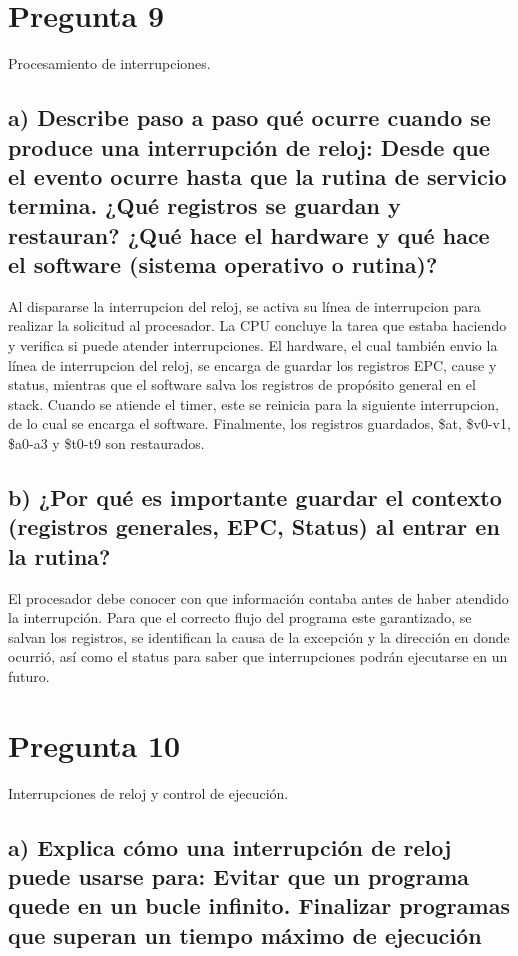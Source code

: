 \documentclass[12pt]{article}
\begin{document}
\section*{Pregunta 9}
Procesamiento de interrupciones.

\subsection*{a) Describe paso a paso qué ocurre cuando se produce una interrupción de reloj: Desde que el evento ocurre hasta que la rutina de servicio termina. ¿Qué registros se guardan y restauran? ¿Qué hace el hardware y qué hace el software (sistema operativo o rutina)?}

Al dispararse la interrupcion del reloj, se activa su línea de interrupcion para realizar la solicitud al procesador. La CPU concluye la tarea que estaba haciendo y verifica si puede atender interrupciones. El hardware, el cual también envio la línea de interrupcion del reloj, se encarga de guardar los registros EPC, cause y status, mientras que el software salva los registros de propósito general en el stack. Cuando se atiende el timer, este se reinicia para la siguiente interrupcion, de lo cual se encarga el software. Finalmente, los registros guardados, \$at, \$v0-v1, \$a0-a3 y \$t0-t9 son restaurados.

\subsection*{b) ¿Por qué es importante guardar el contexto (registros generales, EPC, Status) al entrar en la rutina?}

El procesador debe conocer con que información contaba antes de haber atendido la interrupción. Para que el correcto flujo del programa este garantizado, se salvan los registros, se identifican la causa de la excepción y la dirección en donde ocurrió, así como el status para saber que interrupciones podrán ejecutarse en un futuro.

\section*{Pregunta 10}
Interrupciones de reloj y control de ejecución.

\subsection*{a) Explica cómo una interrupción de reloj puede usarse para: Evitar que un programa quede en un bucle infinito. Finalizar programas que superan un tiempo máximo de ejecución}
\end{document}
